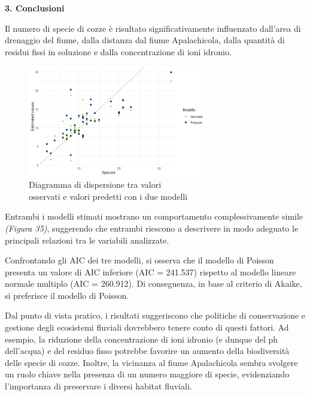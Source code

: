 \documentclass{article} %
\begin{document}
\vskip 35pt
\begin{flushleft}
    \textbf{\Huge 3. \: Conclusioni}
\end{flushleft}
\vskip 10pt

Il numero di specie di cozze è risultato significativamente influenzato dall'area di drenaggio del fiume, dalla distanza dal fiume Apalachicola, dalla quantità di residui fissi in soluzione e dalla concentrazione di ioni idronio.

\begin{figure}[H]
    \centering
    \includegraphics[width=0.7\textwidth]{immagini/lm_glm.png}
    \captionsetup{justification=centering}
    \caption{Diagramma di dispersione tra valori \\osservati e valori predetti con i due modelli}
\end{figure}

Entrambi i modelli stimati mostrano un comportamento complessivamente simile \textit{(Figura 35)}, suggerendo che entrambi riescono a descrivere in modo adeguato le principali relazioni tra le variabili analizzate.

Confrontando gli AIC dei tre modelli, si osserva che il modello di Poisson presenta un valore di AIC inferiore (AIC = 241.537) rispetto al modello lineare normale multiplo (AIC = 260.912). Di conseguenza, in base al criterio di Akaike, si preferisce il modello di Poisson.

Dal punto di vista pratico, i risultati suggeriscono che politiche di conservazione e gestione degli ecosistemi fluviali dovrebbero tenere conto di questi fattori. Ad esempio, la riduzione della concentrazione di ioni idronio (e dunque del ph dell'acqua) e del residuo fisso potrebbe favorire un aumento della biodiversità delle specie di cozze. Inoltre, la vicinanza al fiume Apalachicola sembra svolgere un ruolo chiave nella presenza di un numero maggiore di specie, evidenziando l'importanza di preservare i diversi habitat fluviali.
\end{document}
